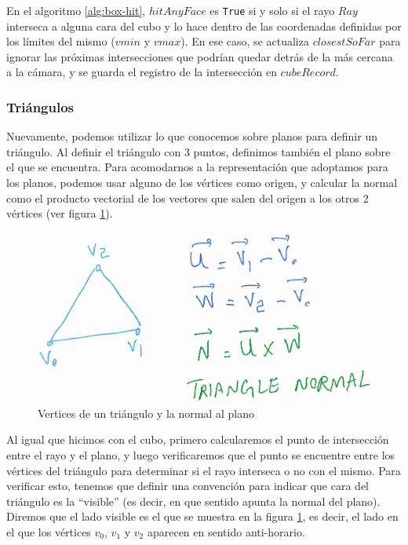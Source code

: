 En el algoritmo \ref{alg:box-hit}, $hitAnyFace$ es \texttt{True} si y solo si el
rayo $Ray$ interseca a alguna cara del cubo y lo hace dentro de las coordenadas
definidas por los límites del mismo ($vmin$ y $vmax$). En ese caso, se actualiza
$closestSoFar$ para ignorar las próximas intersecciones que podrían quedar detrás
de la más cercana a la cámara, y se guarda el registro de la intersección en
$cubeRecord$.

\subsubsection{Triángulos}

Nuevamente, podemos utilizar lo que conocemos sobre planos para definir un
triángulo. Al definir el triángulo con 3 puntos, definimos también el plano sobre
el que se encuentra. Para acomodarnos a la representación que adoptamos para los
planos, podemos usar alguno de los vértices como origen, y calcular la normal
como el producto vectorial de los vectores que salen del origen a los otros 2
vértices (ver figura \ref{fig:triangle-normal}).

\begin{figure}
    \centering
    \includegraphics[width=.7\textwidth]{imgs/triangle-normal.jpg}
    \caption{Vertices de un triángulo y la normal al plano}
    \label{fig:triangle-normal}
\end{figure}

Al igual que hicimos con el cubo, primero calcularemos el punto de intersección
entre el rayo y el plano, y luego verificaremos que el punto se encuentre entre
los vértices del triángulo para determinar si el rayo interseca o no con el
mismo. Para verificar esto, tenemos que definir una convención para indicar que
cara del triángulo es la ``visible'' (es decir, en que sentido apunta la normal
del plano). Diremos que el lado visible es el que se muestra en la figura
\ref{fig:triangle-normal}, es decir, el lado en el que los vértices $v_0$, $v_1$
y $v_2$ aparecen en sentido anti-horario.

